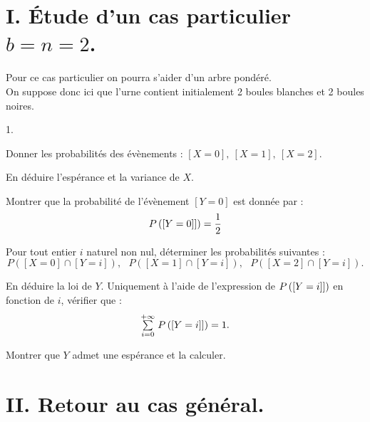 \documentclass[11pt]{article}%
\begin{document}
\section*{I. Étude d'un cas particulier $b = n = 2$.}
\noindent Pour ce cas particulier on pourra s'aider d'un arbre pondéré.
\\
On suppose donc ici que l'urne contient initialement 2 boules blanches
et 2 boules noires. \begin{noliste}{1.}
 \setlength{\itemsep}{4mm}

\item Donner les probabilités des évènements : $[ X = 0],\ [X = 1],\ [X
= 2]$. \\

\item En déduire l'espérance et la variance de $X$. \\

\item Montrer que la probabilité de l'évènement $[Y = 0]$ est donnée
par : 
\[
 P\left(\left[ {Y = 0]} \right]\right) = \frac{1}{2} 
\]

\item Pour tout entier $i$ naturel non nul, déterminer les probabilités
suivantes : 
\[
 P( [X = 0] \cap [Y = i] ), \ \ \ P([X = 1] \cap [Y = i]), \ \ \ P([X =
2] \cap [Y = i]).
\]

\item En déduire la loi de $Y$. Uniquement à l'aide de l'expression de
$P\left(\left[ {Y = i]} \right]\right)$ en fonction de $i$, vérifier que :
\[
{\textstyle\sum\limits_{i = 0}^{+ \infty}}\hspace{.1cm} P\left(\left[ {Y = i]} \right]\right) = 1. 
\]

\item Montrer que $Y$ admet une espérance et la calculer.

\end{noliste}

\section*{II. Retour au cas général.}
\end{document}
